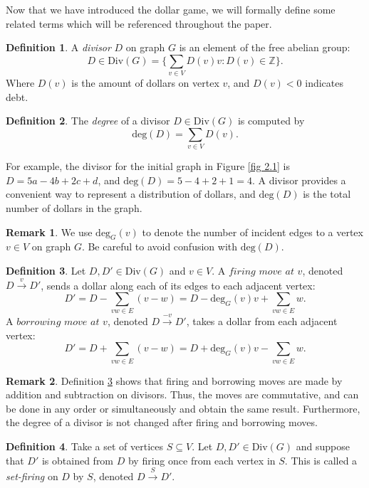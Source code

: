 \documentclass[openany, amssymb, psamsfonts]{amsart}
\theoremstyle{definition}
\newtheorem{defn}{Definition}[section]
\newtheorem{rem}{Remark}[section]
\numberwithin{equation}{section}
\begin{document}
Now that we have introduced the dollar game, we will formally define some related terms which will be referenced throughout the paper. 

\begin{defn}
\label{defn 3.1}
A \textit{divisor} $D$ on graph $G$ is an element of the free abelian group:
\[D\in \text{Div}(G)=\{ \sum_{v\in V}D(v)v:D(v)\in \mathbb{Z} \}.\]
Where $D(v)$ is the amount of dollars on vertex $v$, and $D(v)<0$ indicates debt.
\end{defn}

\begin{defn}
\label{defn 3.2}
The \textit{degree} of a divisor $D\in \text{Div}(G)$ is computed by
\[\text{deg}(D)=\sum_{v\in V}D(v).\]
\end{defn}

For example, the divisor for the initial graph in Figure \ref{fig 2.1} is $D=5a-4b+2c+d$, and $\text{deg}(D)=5-4+2+1=4$. A divisor provides a convenient way to represent a distribution of dollars, and $\text{deg}(D)$ is the total number of dollars in the graph. 

\begin{rem}
We use $\text{deg}_G(v)$ to denote the number of incident edges to a vertex $v\in V$ on graph $G$. Be careful to avoid confusion with $\text{deg}(D)$.
\end{rem}

\begin{defn}
\label{defn 3.3}
Let $D, D'\in \text{Div}(G)$ and $v\in V$. A $\textit{firing move at v}$, denoted $D\xrightarrow{v} D'$, sends a dollar along each of its edges to each adjacent vertex:
\[D'=D-\sum_{vw\in E}(v-w)=D-\text{deg}_G(v)v+\sum_{vw\in E}w.\]
A $\textit{borrowing move at v}$, denoted $D\xrightarrow{-v} D'$, takes a dollar from each adjacent vertex:
\[D'=D+\sum_{vw\in E}(v-w)=D+\text{deg}_G(v)v-\sum_{vw\in E}w.\]
\end{defn}

\begin{rem}
\label{rem 3.1}
Definition \ref{defn 3.3} shows that firing and borrowing moves are made by addition and subtraction on divisors. Thus, the moves are commutative, and can be done in any order or simultaneously and obtain the same result. Furthermore, the degree of a divisor is not changed after firing and borrowing moves.
\end{rem}

\begin{defn}
\label{defn 3.4}
Take a set of vertices $S\subseteq V$. Let $D, D'\in \text{Div}(G)$ and suppose that $D'$ is obtained from $D$ by firing once from each vertex in $S$. This is called a \textit{set-firing} on $D$ by $S$, denoted $D\xrightarrow{S} D'$.
\end{defn}
\end{document}
